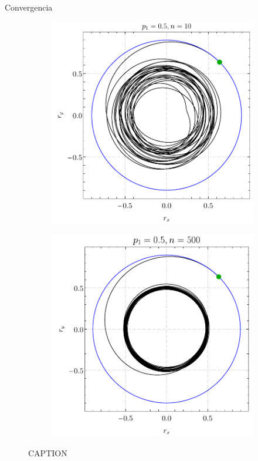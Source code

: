 \begin{frame}{Convergencia}
    \begin{figure}
        \begin{subfigure}{0.45\textwidth}
            \centering
            \includegraphics[width=1.\textwidth]{figures/maxent_results/local_all_ran_p=0.5_r=0.9_n=10_a=-3_b=3.pdf}
        \end{subfigure}
        \begin{subfigure}{0.45\textwidth}
            \centering
            \includegraphics[width=1.\textwidth]{figures/maxent_results/local_all_ran_p=0.5_r=0.9_n=500_a=-3_b=3.pdf}
        \end{subfigure}
        \caption{CAPTION}
       \end{figure}
\end{frame}


